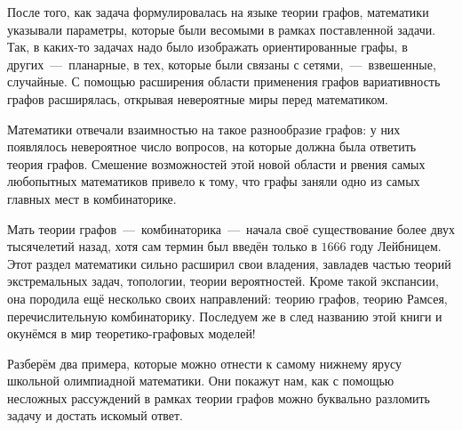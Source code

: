 	После того, как задача формулировалась на языке теории графов, математики указывали параметры, которые были весомыми в рамках поставленной задачи. Так, в каких-то задачах надо было изображать ориентированные графы, в других~---~планарные, в тех, которые были связаны с сетями,~---~взвешенные, случайные. С помощью расширения области применения графов вариативность графов расширялась, открывая невероятные миры перед математиком.	 

	Математики отвечали взаимностью на такое разнообразие графов: у них появлялось невероятное число вопросов, на которые должна была ответить теория графов. Смешение возможностей этой новой области и рвения самых любопытных математиков привело к тому, что графы заняли одно из самых главных мест в комбинаторике. 
	
	Мать теории графов~---~комбинаторика~---~начала своё существование более двух тысячелетий назад, хотя сам термин был введён только в $1666$ году Лейбницем. Этот раздел математики сильно расширил свои владения, завладев частью теорий экстремальных задач, топологии, теории вероятностей. Кроме такой экспансии, она породила ещё несколько своих направлений: теорию графов, теорию Рамсея, перечислительную комбинаторику. Последуем же в след названию этой книги и окунёмся в мир теоретико-графовых моделей!
	
	
	Разберём два примера, которые можно отнести к самому нижнему ярусу школьной олимпиадной математики. Они покажут нам, как с помощью несложных рассуждений в рамках теории графов можно буквально разломить задачу и достать искомый ответ.
	
